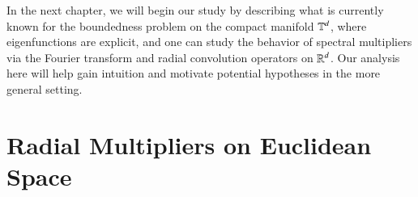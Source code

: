 In the next chapter, we will begin our study by describing what is currently known for the boundedness problem on the compact manifold $\operatorname{\mathbb{T}}^d$, where eigenfunctions are explicit, and one can study the behavior of spectral multipliers via the Fourier transform and radial convolution operators on $\operatorname{\mathbb{R}}^d$. Our analysis here will help gain intuition and motivate potential hypotheses in the more general setting.


%

%

\chapter{Radial Multipliers on Euclidean Space} \label{sec:radmult}


